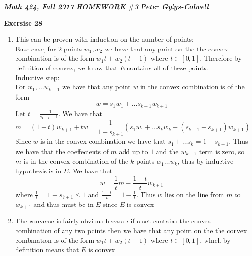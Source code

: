 \documentclass[12pt]{article}
\newenvironment{ques}[1]{\textbf{Exersise #1}\vspace{1 mm}\\ }{\bigskip}
\theoremstyle{definition}
\begin{document}
\noindent \textit{\textbf{Math 424, Fall 2017}} \hspace{1.3cm}
\textit{\textbf{HOMEWORK $\#$3}} \hspace{1.3cm} \textit{\textbf{Peter
Gylys-Colwell}} 

\vspace{1cm}

\begin{ques}{28}
\begin{enumerate}
\item
	This can be proven with induction on the number of points: \\
	Base case, for $2$ points $w_1, w_2$ we have that any point on the the
	convex combination is of the form $w_1 t + w_2(t-1)$ where $t \in [0,1]$.
	Therefore by definition of convex, we know that $E$ contains all of these
	points.\\
	Inductive step:\\
	For $w_1, \dots w_{k+1}$ we have that any point $w$ in the convex combination
	is of the form
	$$w =s_1w_1 + \dots s_{k+1}w_{k+1}$$
	Let $t = \frac{-1}{s_{k+1} - 1}$. We have that 
	$$m = (1 - t)w_{k+1} + tw = \frac{1}{1 - s_{k+1}}(s_1w_1 + \dots s_kw_k +
	(s_{k+1} - s_{k+1})w_{k+1})$$
	Since $w$ is in the convex combination we have that $s_1 + \dots s_k = 1 -
	s_{k+1}$. Thus we have that the coeffecients of $m$ add up to $1$ and the
	$w_{k+1}$ term is zero, so $m$ is in the convex combination of the $k$
	points $w_1 \dots w_k$, thus by inductive hypothesis is
	in $E$. We have that
	$$w = \frac{1}{t}m - \frac{1 - t}{t} w_{k+1}$$
	where $\frac 1 t = 1 - s_{k+1} \leq 1$ and $\frac {1-t}{t} = 1 - \frac 1
	t$. Thus $w$ lies on the line from $m$ to $w_{k+1}$ and thus must be in $E$
	since $E$ is convex

\item
	The converse is fairly obvious because if a set contains the convex
	combination of any two points then we have that any point on the the
	convex combination is of the form $w_1 t + w_2(t-1)$ where $t \in [0,1]$,
	which by definition means that $E$ is convex
\end{enumerate}
\end{ques}
\end{document}
